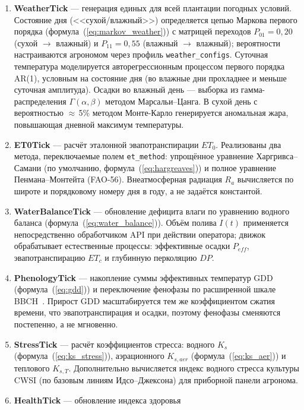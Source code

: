 \begin{enumerate}
    \item \textbf{WeatherTick} --- генерация единых для всей
    плантации погодных условий. Состояние дня
    (<<сухой/влажный>>) определяется цепью Маркова первого
    порядка (формула~(\ref{eq:markov_weather})) с матрицей
    переходов $P_{01} = 0{,}20$ (сухой $\to$ влажный) и
    $P_{11} = 0{,}55$ (влажный $\to$ влажный); вероятности
    настраиваются агрономом через профиль
    \texttt{weather\_configs}. Суточная температура
    моделируется авторегрессионным процессом первого порядка
    AR(1), условным на состояние дня (во влажные дни прохладнее
    и меньше суточная амплитуда). Осадки во влажный день ---
    выборка из гамма-распределения $\Gamma(\alpha, \beta)$
    методом Марсальи--Цанга. В сухой день с вероятностью
    $\approx$\,5\% методом Монте-Карло генерируется аномальная
    жара, повышающая дневной максимум температуры.
    \item \textbf{ET0Tick} --- расчёт эталонной эвапотранспирации
    $ET_0$. Реализованы два метода, переключаемые полем
    \texttt{et\_method}: упрощённое уравнение Харгривса--Самани
    (по умолчанию, формула~(\ref{eq:hargreaves})) и полное
    уравнение Пенмана--Монтейта (FAO-56). Внеатмосферная
    радиация $R_a$ вычисляется по широте и порядковому номеру
    дня в году, а не задаётся константой.
    \item \textbf{WaterBalanceTick} --- обновление дефицита
    влаги по уравнению водного баланса
    (формула~(\ref{eq:water_balance})). Объём полива $I(t)$
    применяется непосредственно обработчиком API при действии
    оператора; движок обрабатывает естественные процессы:
    эффективные осадки $P_{eff}$, эвапотранспирацию $ET_c$
    и глубинную перколяцию $DP$.
    \item \textbf{PhenologyTick} --- накопление суммы
    эффективных температур GDD
    (формула~(\ref{eq:gdd})) и переключение фенофазы
    по расширенной шкале BBCH~\cite{wei2013_litchi_bbch}.
    Прирост GDD масштабируется тем же коэффициентом сжатия
    времени, что эвапотранспирация и осадки, поэтому фенофазы
    сменяются постепенно, а не мгновенно.
    \item \textbf{StressTick} --- расчёт коэффициентов
    стресса: водного $K_s$ (формула~(\ref{eq:ks_stress})),
    аэрационного $K_{s,aer}$
    (формула~(\ref{eq:ks_aer})) и теплового $K_{s,T}$.
    Дополнительно вычисляется индекс водного стресса культуры
    CWSI (по базовым линиям Идсо--Джексона) для приборной
    панели агронома.
    \item \textbf{HealthTick} --- обновление индекса здоровья

\end{enumerate}
